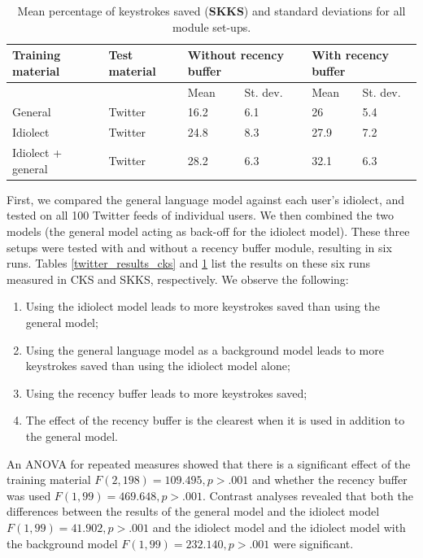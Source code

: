 \documentclass[11pt]{article}
\begin{document}
\begin{table}[htb] 
\centering
\begin{tabular}{ll|llll} 
Training material&Test material&\multicolumn{2}{l}{Without recency buffer}&\multicolumn{2}{l}{With recency buffer}\\
\hline
&&Mean&St. dev.&Mean&St. dev.\\
General&Twitter&16.2&6.1&26&5.4\\
Idiolect&Twitter&24.8&8.3&27.9&7.2\\
Idiolect + general&Twitter&28.2&6.3&32.1&6.3\\
\end{tabular} 
\caption{Mean percentage of keystrokes saved (\textbf{SKKS}) and standard deviations for all module set-ups.} \label{twitter_results_skks}
\end{table}

First, we compared the general language model against each user's idiolect, and tested on all 100 Twitter feeds of individual users. We then combined the two models (the general model acting as back-off for the idiolect model). These three setups were tested with and without a recency buffer module, resulting in six runs. Tables \ref{twitter_results_cks} and \ref{twitter_results_skks} list the results on these six runs measured in CKS and SKKS, respectively. We observe the following:

\begin{enumerate}
\item Using the idiolect model leads to more keystrokes saved than using the general model;
\item Using the general language model as a background model leads to more keystrokes saved than using the idiolect model alone;
\item Using the recency buffer leads to more keystrokes saved;
\item The effect of the recency buffer is the clearest when it is used in addition to the general model.
\end{enumerate}

An ANOVA for repeated measures showed that there is a significant effect of the training material $F(2,198) = 109.495, p > .001$ and whether the recency buffer was used $F(1,99) = 469.648, p > .001$. Contrast analyses revealed that both the differences between the results of the general model and the idiolect model $F(1,99) = 41.902, p > .001$ and the idiolect model and the idiolect model with the background model $F(1,99) = 232.140, p > .001$ were significant.
\end{document}
